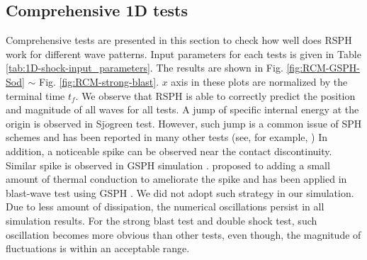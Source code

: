 \documentclass[preprint,12pt,authoryear]{elsarticle}
\begin{document}
\subsection{Comprehensive 1D tests} \label{sec:comprehensive-1d-tests}
Comprehensive tests are presented in this section to check how well does RSPH work for different wave patterns. Input parameters for each tests is given in Table \ref{tab:1D-shock-input_parameters}.
The results are shown in Fig. \ref{fig:RCM-GSPH-Sod} $\sim$ Fig. \ref{fig:RCM-strong-blast}. $x$ axis in these plots are normalized by the terminal time $t_f$. 
We observe that RSPH is able to correctly predict the position and magnitude of all waves for all tests. A jump of specific internal energy at the origin is observed in Sj$\ddot{o}$green test. However, such jump is a common issue of SPH schemes and has been reported in many other tests (see, for example, \citep{monaghan1997sph,cha2003implementations,puri2014approximate})
In addition, a noticeable spike can be observed near the contact discontinuity. Similar spike is observed in GSPH simulation \citep{puri2014comparison}.
\citet{noh1987errors} proposed to adding a small amount of thermal conduction to ameliorate the spike and has been applied in blast-wave test using GSPH \citep{puri2014comparison}. We did not adopt such strategy in our simulation.
Due to less amount of dissipation, the numerical oscillations
 persist in all simulation results. For the strong blast test and double shock test, such oscillation becomes more obvious than other tests, even though, the magnitude of fluctuations is within an acceptable range.
\end{document}
